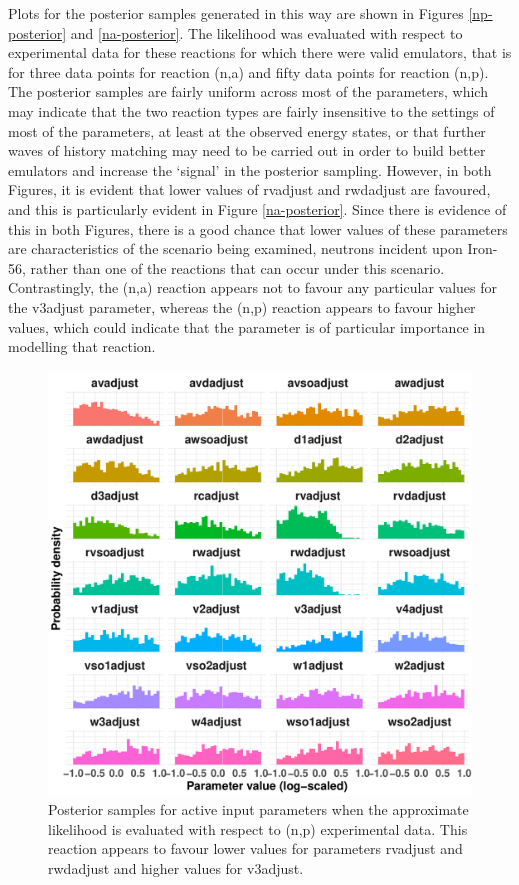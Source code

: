 \documentclass[
  12pt,
  a4paper,
  twoside]{book}
\begin{document}
Plots for the posterior samples generated in this way are shown in Figures \ref{np-posterior} and \ref{na-posterior}. The likelihood was evaluated with respect to experimental data for these reactions for which there were valid emulators, that is for three data points for reaction (n,a) and fifty data points for reaction (n,p). The posterior samples are fairly uniform across most of the parameters, which may indicate that the two reaction types are fairly insensitive to the settings of most of the parameters, at least at the observed energy states, or that further waves of history matching may need to be carried out in order to build better emulators and increase the `signal' in the posterior sampling. However, in both Figures, it is evident that lower values of rvadjust and rwdadjust are favoured, and this is particularly evident in Figure \ref{na-posterior}. Since there is evidence of this in both Figures, there is a good chance that lower values of these parameters are characteristics of the scenario being examined, neutrons incident upon Iron-56, rather than one of the reactions that can occur under this scenario. Contrastingly, the (n,a) reaction appears not to favour any particular values for the v3adjust parameter, whereas the (n,p) reaction appears to favour higher values, which could indicate that the parameter is of particular importance in modelling that reaction.

\begin{figure}[H]

{\centering \includegraphics[width=0.8\linewidth]{figures/np_posterior} 

}

\caption{Posterior samples for active input parameters when the approximate likelihood is evaluated with respect to (n,p) experimental data. This reaction appears to favour lower values for parameters rvadjust and rwdadjust and higher values for v3adjust.}\label{fig:np-posterior}
\end{figure}
\end{document}
